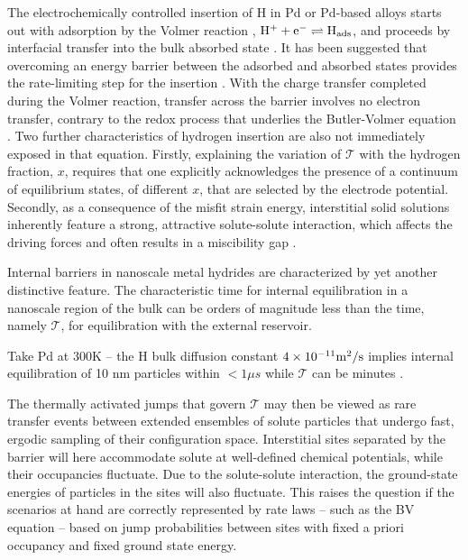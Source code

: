 \documentclass[english,aps,prb,showkeys,reprint]{revtex4-2}
\begin{document}
The electrochemically controlled insertion of H in Pd or Pd-based alloys starts out with adsorption by the Volmer reaction \cite{Lasia2019}, $\rm H^+ + e^- \rightleftharpoons H_{ads}$, and proceeds by interfacial transfer into the bulk absorbed state \cite{Jerkiewicz1998}. It has been suggested that overcoming an energy barrier between the adsorbed and absorbed states provides the rate-limiting step for the insertion \cite{BapariWeissmüller2025}. With the charge transfer completed during the Volmer reaction, transfer across the barrier involves no electron transfer, contrary to the redox process that underlies the Butler-Volmer equation \cite{BockrisKhan1993,BardFaulkner2001}. Two further characteristics of hydrogen insertion are also not immediately exposed in that equation. Firstly, explaining the variation of $\mathcal T$ with the hydrogen fraction, $x$, requires that one explicitly acknowledges the presence of a continuum of equilibrium states, of different $x$, that are selected by the electrode potential. Secondly, as a consequence of the misfit strain energy, interstitial solid solutions inherently feature a strong, attractive solute-solute interaction, which affects the driving forces and often results in a miscibility gap \cite{WeissmuellerInterstitial2024}.

Internal barriers in nanoscale metal hydrides are characterized by yet another distinctive feature. The characteristic time for internal equilibration in a nanoscale region of the bulk can be orders of magnitude less than the time, namely $\mathcal T$, for equilibration with the external reservoir.

Take Pd at 300K -- the H bulk diffusion constant $\rm 4 \times 10^{-11} m^2/s$ \cite{FlanaganOates1991} implies internal equilibration of 10 nm particles within $< 1 \mu s$ while $\mathcal T$ can be minutes \cite{ShanShi2017,Dionne2018,BapariWeissmüller2025}.

The thermally activated jumps that govern $\mathcal T$ may then be viewed as rare transfer events between extended ensembles of solute particles that undergo fast, ergodic sampling of their configuration space. Interstitial sites separated by the barrier will here accommodate solute at well-defined chemical potentials, while their occupancies fluctuate. Due to the solute-solute interaction, the ground-state energies of particles in the sites will also fluctuate. This raises the question if the scenarios at hand are correctly represented by rate laws -- such as the BV equation -- based on jump probabilities between sites with fixed a priori occupancy and fixed ground state energy.
\end{document}
